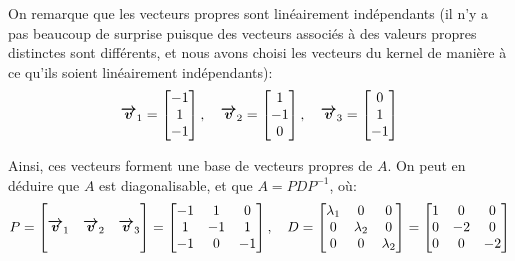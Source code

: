 \documentclass[a4paper]{article}
\begin{document}
{    On remarque que les vecteurs propres sont linéairement indépendants (il n'y a pas beaucoup de surprise puisque des vecteurs associés à des valeurs propres distinctes sont différents, et nous avons choisi les vecteurs du kernel de manière à ce qu'ils soient linéairement indépendants):
    \[\bm{\protect\overrightarrow{v}}_1 = \begin{bmatrix} -1 \\ 1 \\ -1 \end{bmatrix}, \quad \bm{\protect\overrightarrow{v}}_2 = \begin{bmatrix} 1 \\ -1 \\ 0 \end{bmatrix}, \quad \bm{\protect\overrightarrow{v}}_3 = \begin{bmatrix} 0 \\ 1 \\ -1 \end{bmatrix} \]
    
    Ainsi, ces vecteurs forment une base de vecteurs propres de $A$.  On peut en déduire que $A$ est diagonalisable, et que $A = PDP^{-1}$, où: 
    \[P = \begin{bmatrix}  &  &  \\ \bm{\protect\overrightarrow{v}}_1 & \bm{\protect\overrightarrow{v}}_2 & \bm{\protect\overrightarrow{v}}_3 \\  &  &  \end{bmatrix} = \begin{bmatrix} -1 & 1 & 0 \\ 1 & -1 & 1 \\ -1 & 0 & -1 \end{bmatrix}, \quad D = \begin{bmatrix} \lambda_1 & 0 & 0 \\ 0 & \lambda_2 & 0 \\ 0 & 0 & \lambda_2 \end{bmatrix} = \begin{bmatrix} 1 & 0 & 0 \\ 0 & -2 & 0 \\ 0 & 0 & -2 \end{bmatrix} \]
    
}
\end{document}
